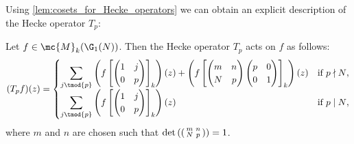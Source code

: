     Using \cref{lem:cosets_for_Hecke_operators} we can obtain an explicit description of the Hecke operator $T_{p}$:

    \begin{proposition}\label{prop:explicit_description_of_Hecke_operators_holomorphic}
      Let $f \in \mc{M}_{k}(\G_{1}(N))$. Then the Hecke operator $T_{p}$ acts on $f$ as follows:
      \[
        (T_{p}f)(z) = \begin{cases} \displaystyle{\sum_{j \tmod{p}}}\left(f\left[\begin{pmatrix} 1 & j \\ 0 & p \end{pmatrix}\right]_{k}\right)(z)+\left(f\left[\begin{pmatrix} m & n \\ N & p \end{pmatrix}\begin{pmatrix} p & 0 \\ 0 & 1 \end{pmatrix}\right]_{k}\right)(z) & \text{if $p \nmid N$}, \\ \displaystyle{\sum_{j \tmod{p}}}\left(f\left[\begin{pmatrix} 1 & j \\ 0 & p \end{pmatrix}\right]_{k}\right)(z) & \text{if $p \mid N$}, \end{cases}
      \]
      where $m$ and $n$ are chosen such that $\det\left(\begin{psmallmatrix} m & n \\ N & p \end{psmallmatrix}\right) = 1$.
    \end{proposition}
